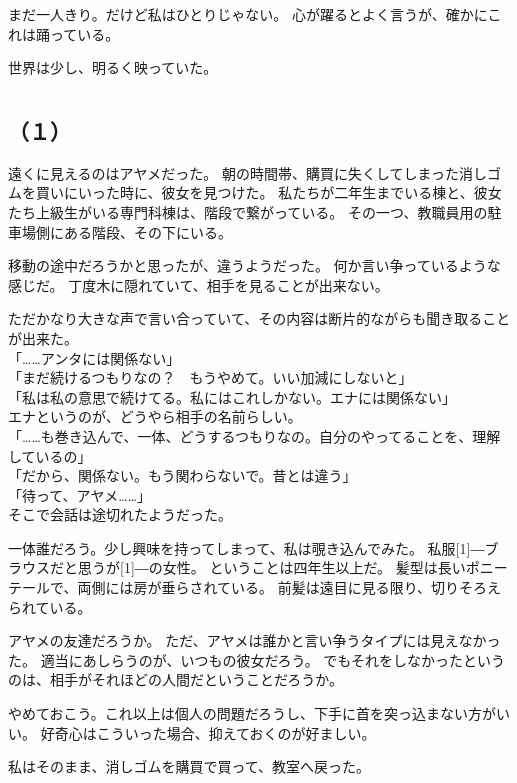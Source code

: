 \documentclass[../IHMain]{subfiles}
\begin{document}
まだ一人きり。だけど私はひとりじゃない。
心が躍るとよく言うが、確かにこれは踊っている。

世界は少し、明るく映っていた。

\section{}
\subsection*{（１）}
遠くに見えるのはアヤメだった。
朝の時間帯、購買に失くしてしまった消しゴムを買いにいった時に、彼女を見つけた。
私たちが二年生までいる棟と、彼女たち上級生がいる専門科棟は、階段で繋がっている。
その一つ、教職員用の駐車場側にある階段、その下にいる。

移動の途中だろうかと思ったが、違うようだった。
何か言い争っているような感じだ。
丁度木に隠れていて、相手を見ることが出来ない。

ただかなり大きな声で言い合っていて、その内容は断片的ながらも聞き取ることが出来た。\\

「……アンタには関係ない」\\
「まだ続けるつもりなの？　もうやめて。いい加減にしないと」\\
「私は私の意思で続けてる。私にはこれしかない。エナには関係ない」\\
エナというのが、どうやら相手の名前らしい。\\
「……も巻き込んで、一体、どうするつもりなの。自分のやってることを、理解しているの」\\
「だから、関係ない。もう関わらないで。昔とは違う」\\
「待って、アヤメ……」\\
そこで会話は途切れたようだった。

一体誰だろう。少し興味を持ってしまって、私は覗き込んでみた。
私服\scalebox{3}[1]{―}ブラウスだと思うが\scalebox{3}[1]{―}の女性。
ということは四年生以上だ。
髪型は長いポニーテールで、両側には房が垂らされている。
前髪は遠目に見る限り、切りそろえられている。

アヤメの友達だろうか。
ただ、アヤメは誰かと言い争うタイプには見えなかった。
適当にあしらうのが、いつもの彼女だろう。
でもそれをしなかったというのは、相手がそれほどの人間だということだろうか。

やめておこう。これ以上は個人の問題だろうし、下手に首を突っ込まない方がいい。
好奇心はこういった場合、抑えておくのが好ましい。

私はそのまま、消しゴムを購買で買って、教室へ戻った。
\end{document}

